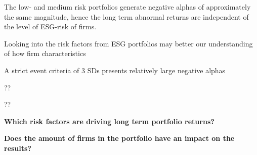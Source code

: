 The low- and medium risk portfolios generate negative alphas of approximately the same magnitude, hence the long term abnormal returns are independent of the level of ESG-risk of firms.  








Looking into the risk factors from ESG portfolios may better our understanding of how firm characteristics 



A strict event criteria of 3 SDs presents relatively large negative alphas

??


??






\textbf{Which risk factors are driving long term portfolio returns?}


\textbf{Does the amount of firms in the portfolio have an impact on the results?}
